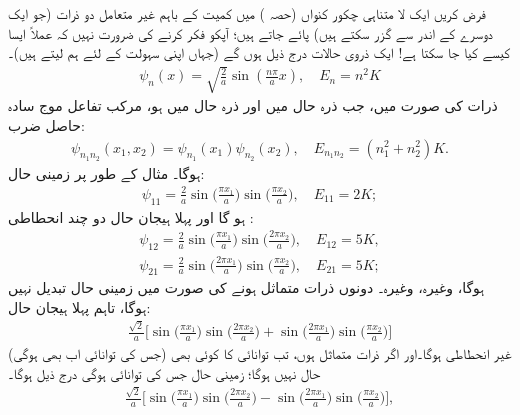 

فرض کریں ایک لا متناہی چکور کنواں (حصہ )  میں کمیت   کے باہم غیر متعامل دو ذرات  (جو ایک دوسرے کے اندر سے گزر سکتے ہیں)  پائے جاتے ہیں؛ آپکو فکر کرنے کی ضرورت نہیں کہ عملاً  ایسا کیسے کیا جا سکتا ہے!  ایک ذروی حالات درج ذیل ہوں گے (جہاں اپنی سہولت  کے لئے ہم     لیتے ہیں)۔
\begin{align*}
 \psi_{n} (x)=\sqrt{\frac{2}{a}}\sin(\tfrac{n \pi}{a}x), \quad E_{n}=n^2 K 
\end{align*}
  ذرات کی صورت میں،  جب  ذرہ  حال    میں اور ذرہ  حال   میں ہو،  مرکب تفاعل موج سادہ حاصل ضرب:
\begin{align*}
 \psi_{n_{1} n_{2}} (x_{1},x_{2})=\psi_{n_{1}}(x_{1})\psi_{n_{2}}(x_{2}), \quad E_{n_{1} n_{2}}= (n_{1}^2+n_{2}^2)K. 
\end{align*}
 ہوگا۔ مثال کے طور پر زمینی حال:
\begin{align*}
 \psi_{11}=\frac{2}{a}\sin\big(\frac{\pi x_{1}}{a}\big) \sin\big(\frac{\pi x_{2}}{a}\big), \quad E_{11}=2K; 
\end{align*}
ہو گا اور پہلا ہیجان حال دو چند انحطاطی :
\begin{align*}
 \psi_{12}=\frac{2}{a}\sin\big(\frac{\pi x_{1}}{a}\big) \sin\big(\frac{2\pi x_{2}}{a}\big), \quad E_{12}=5K, \\
\psi_{21}=\frac{2}{a}\sin\big(\frac{2\pi x_{1}}{a}\big) \sin\big(\frac{\pi x_{2}}{a}\big), \quad E_{21}=5K; 
\end{align*}
ہوگا، وغیرہ،  وغیرہ۔ دونوں ذرات متماثل ہونے کی صورت میں زمینی حال تبدیل نہیں ہوگا،  تاہم پہلا ہیجان حال:
\begin{align*}
\frac{\sqrt{2}}{a}\big[\sin\big(\frac{\pi x_{1}}{a}\big)\sin\big(\frac{2\pi x_{2}}{a}\big)+ \sin\big(\frac{2 \pi x_{1}}{a}\big)\sin\big(\frac{\pi x_{2}}{a}\big)\big]
\end{align*} 
 (جس کی توانائی اب بھی   ہوگی)  غیر انحطاطی ہوگا۔اور اگر ذرات متماثل  ہوں، تب     توانائی کا  کوئی بھی  حال نہیں ہوگا؛   زمینی حال جس کی توانائی   ہوگی  درج ذیل ہوگا۔
\begin{align*}
\frac{\sqrt{2}}{a}\big[\sin\big(\frac{\pi x_{1}}{a}\big) \sin\big(\frac{2 \pi x_{2}}{a}\big)- \sin\big(\frac{2 \pi x_{1}}{a}\big) \sin\big(\frac{\pi x_{2}}{a}\big)\big], 
\end{align*}
